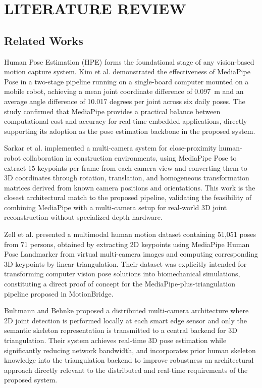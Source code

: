 \chapter{LITERATURE REVIEW}
\section{Related Works}
 
Human Pose Estimation (HPE) forms the foundational stage of any vision-based motion capture system. Kim et al. \cite{kim2023} demonstrated the effectiveness of MediaPipe Pose in a two-stage pipeline running on a single-board computer mounted on a mobile robot, achieving a mean joint coordinate difference of 0.097~m and an average angle difference of 10.017 degrees per joint across six daily poses. The study confirmed that MediaPipe provides a practical balance between computational cost and accuracy for real-time embedded applications, directly supporting its adoption as the pose estimation backbone in the proposed system.
 
Sarkar et al. \cite{sarkar2022} implemented a multi-camera system for close-proximity human-robot collaboration in construction environments, using MediaPipe Pose to extract 15 keypoints per frame from each camera view and converting them to 3D coordinates through rotation, translation, and homogeneous transformation matrices derived from known camera positions and orientations. This work is the closest architectural match to the proposed pipeline, validating the feasibility of combining MediaPipe with a multi-camera setup for real-world 3D joint reconstruction without specialized depth hardware.
 
Zell et al. \cite{zell2024} presented a multimodal human motion dataset containing 51,051 poses from 71 persons, obtained by extracting 2D keypoints using MediaPipe Human Pose Landmarker from virtual multi-camera images and computing corresponding 3D keypoints by linear triangulation. Their dataset was explicitly intended for transforming computer vision pose solutions into biomechanical simulations, constituting a direct proof of concept for the MediaPipe-plus-triangulation pipeline proposed in MotionBridge.
 
Bultmann and Behnke \cite{bultmann2021} proposed a distributed multi-camera architecture where 2D joint detection is performed locally at each smart edge sensor and only the semantic skeleton representation is transmitted to a central backend for 3D triangulation. Their system achieves real-time 3D pose estimation while significantly reducing network bandwidth, and incorporates prior human skeleton knowledge into the triangulation backend to improve robustness an architectural approach directly relevant to the distributed and real-time requirements of the proposed system.
 
